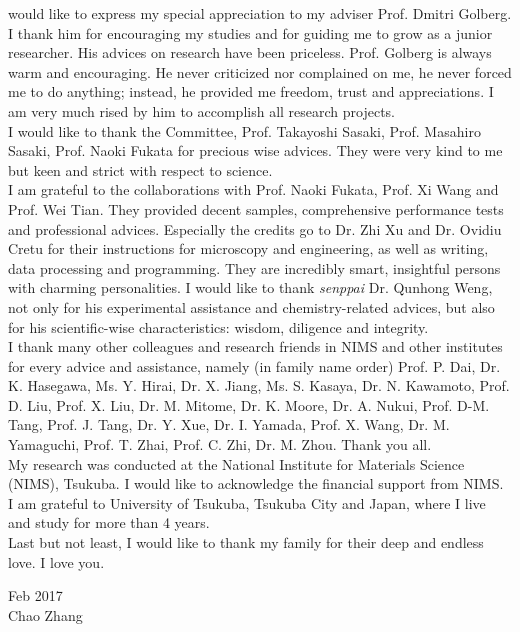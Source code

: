 
 would like to express my special appreciation to my adviser Prof. Dmitri Golberg. I thank him for encouraging my studies and for guiding me to grow as a junior researcher. His advices on research have been priceless. Prof. Golberg is always warm and encouraging. He never criticized nor complained on me, he never forced me to do anything; instead, he provided me freedom, trust and appreciations. I am very much rised by him to accomplish all research projects. \\
I would like to thank the Committee, Prof. Takayoshi Sasaki, Prof. Masahiro Sasaki, Prof. Naoki Fukata for precious wise advices. They were very kind to me but keen and strict with respect to science. \\
I am grateful to the collaborations with Prof. Naoki Fukata, Prof. Xi Wang and Prof. Wei Tian. They provided decent samples, comprehensive performance tests and professional advices. 
Especially the credits go to Dr. Zhi Xu and Dr. Ovidiu Cretu for their instructions for microscopy and engineering, as well as writing, data processing and programming. They are incredibly smart, insightful persons with charming personalities. 
I would like to thank {\em senppai} Dr. Qunhong Weng, not only for his experimental assistance and chemistry-related advices, but also for his scientific-wise characteristics: wisdom, diligence and integrity. \\
I thank many other colleagues and research friends in NIMS and other institutes for every advice and assistance, namely (in family name order) Prof. P. Dai, Dr. K. Hasegawa, Ms. Y. Hirai, Dr. X. Jiang, Ms. S. Kasaya, Dr. N. Kawamoto, Prof. D. Liu, Prof. X. Liu, Dr. M. Mitome, Dr. K. Moore, Dr. A. Nukui, Prof. D-M. Tang, Prof. J. Tang, Dr. Y. Xue, Dr. I. Yamada, Prof. X. Wang, Dr. M. Yamaguchi, Prof. T. Zhai, Prof. C. Zhi, Dr. M. Zhou. Thank you all. 
\\
My research was conducted at the National Institute for Materials Science (NIMS), Tsukuba. I would like to acknowledge the financial support from NIMS.\\
I am grateful to University of Tsukuba, Tsukuba City and Japan, where I live and study for more than 4 years. \\
Last but not least, I would like to thank my family for their deep and endless love. I love you. \\[9ex]

\begin{flushright}
Feb 2017\\
Chao Zhang
\end{flushright}

